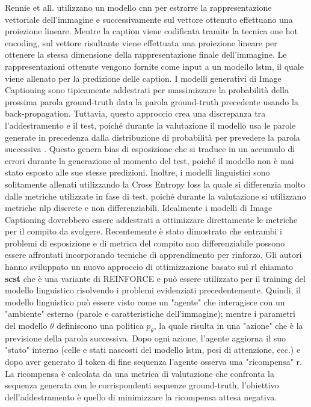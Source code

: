 Rennie et all. \cite{rennie2017self} utilizzano un modello \acrshort{cnn} per estrarre la rappresentazione vettoriale dell'immagine e successivamente sul vettore ottenuto effettuano una proiezione lineare. Mentre la caption viene codificata tramite la tecnica one hot encoding, sul vettore risultante viene effettuata una proiezione lineare per ottenere la stessa dimensione della rappresentazione finale dell'immagine.
Le rappresentazioni ottenute vengono fornite come input a un modello \acrshort{lstm}, il quale viene allenato per la predizione delle caption.
I modelli generativi di Image Captioning sono tipicamente addestrati per massimizzare la probabilità della prossima parola ground-truth data la parola ground-truth precedente usando la back-propagation. Tuttavia, questo approccio crea una discrepanza tra l'addestramento e il test, poiché durante la valutazione il modello usa le parole generate in precedenza dalla distribuzione di probabilità per prevedere la parola successiva \cite{ranzato2015sequence}. Questo genera bias di esposizione che si traduce in un accumulo di errori durante la generazione al momento del test, poiché il modello non è mai stato esposto alle sue stesse predizioni.
Inoltre, i modelli linguistici sono solitamente allenati utilizzando la Cross Entropy loss la quale si differenzia molto dalle metriche utilizzate in fase di test, poiché durante la valutazione si utilizzano metriche \acrshort{nlp} discrete e non differenziabili. Idealmente i modelli di Image Captioning dovrebbero essere addestrati a ottimizzare direttamente le metriche per il compito da svolgere.
Recentemente è stato dimostrato che entrambi i problemi di esposizione e di metrica del compito non differenziabile possono essere affrontati incorporando tecniche di apprendimento per rinforzo.
Gli autori \cite{rennie2017self} hanno sviluppato un nuovo approccio di ottimizzazione basato sul \acrlong{rl} chiamato \textbf{\acrfull{scst}} \label{scst} che è una variante di REINFORCE e può essere utilizzato per il training del modello linguistico risolvendo i problemi evidenziati precedentemente.
Quindi, il modello linguistico può essere visto come un "agente" che interagisce con un "ambiente" esterno (parole e caratteristiche dell'immagine); mentre i parametri del modello $\theta$ definiscono una politica $p_\theta$, la quale risulta in una "azione" che è la previsione della parola successiva.
Dopo ogni azione, l'agente aggiorna il suo "stato" interno (celle e stati nascosti del modello \acrshort{lstm}, pesi di attenzione, ecc.) e dopo aver generato il token di fine sequenza l'agente osserva una "ricompensa" r. La ricompensa è calcolata da una metrica di valutazione che confronta la sequenza generata con le corrispondenti sequenze ground-truth, l'obiettivo dell'addestramento è quello di minimizzare la ricompensa attesa negativa.

